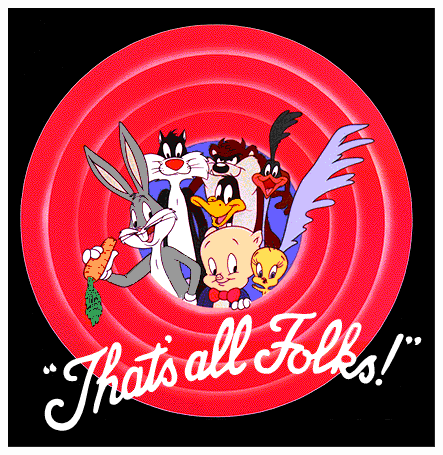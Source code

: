 \documentclass[preprint,12pt]{revtex4}
\begin{document}

\vspace{2cm}
\begin{center}
\includegraphics[scale=.5]{thatsallfolks}
\end{center}
\end{document}
